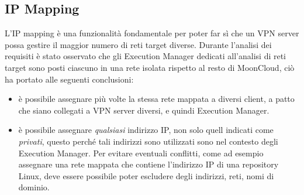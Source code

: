 \subsection{IP Mapping}
L'IP mapping è una funzionalità fondamentale per poter far sì che un VPN server possa
gestire il maggior numero di reti target diverse.
Durante l'analisi dei requisiti è stato osservato che
gli Execution Manager dedicati all'analisi di reti target sono posti
ciascuno in una rete isolata rispetto al resto di MoonCloud, ciò ha portato
alle seguenti conclusioni:
\begin{itemize}
	\item è possibile assegnare più volte la stessa rete mappata a diversi client,
	      a patto che siano collegati a VPN server diversi, e quindi Execution Manager.
	\item è possibile assegnare \textit{qualsiasi} indirizzo IP, non solo quell
	      indicati come \textit{privati}, questo perché tali indirizzi sono utilizzati
	      sono nel contesto degli Execution Manager. Per evitare eventuali conflitti,
	      come ad esempio assegnare una rete mappata che contiene l'indirizzo IP
	      di una repository Linux, deve essere possibile poter escludere degli indirizzi,
	      reti, nomi di dominio.
\end{itemize}

